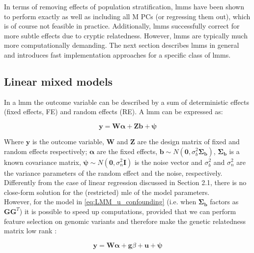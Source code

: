 In terms of removing effects of population stratification, \gls{lmm}s have been shown to perform exactly as well as  including all M PCs (or regressing them out), which is of course not feasible in practice.
Additionally, \gls{lmm}s successfully correct for more subtle effects due to cryptic relatedness.
However, \gls{lmm}s are typically much more computationally demanding.
The next section describes \gls{lmm}s in general and introduces fast implementation approaches for a specific class of \gls{lmm}s.

\subsection{Linear mixed models}

In a \gls{lmm} the outcome variable can be described by a sum of deterministic effects (fixed effects, FE) and random effects (RE).
A \gls{lmm} can be expressed as:

\begin{equation}\label{eq:Linear_mixed_model}
 \mathbf{y} =  \mathbf{W}\boldsymbol{\alpha} + \mathbf{Z}\mathbf{b} + \boldsymbol{\psi} 
\end{equation}

Where $\mathbf{y}$ is the outcome variable, $\mathbf{W}$ and $\mathbf{Z}$ are the design matrix of fixed and random effects respectively; $\boldsymbol{\alpha}$ are the fixed effects, $\mathbf{b} \sim N(\mathbf{0},\sigma_b^2\boldsymbol{\Sigma_b})$, $\boldsymbol{\Sigma_b}$ is a known covariance matrix, $\boldsymbol{\psi} \sim N(\mathbf{0},\sigma_n^2\mathbf{I})$ is the noise vector and $\sigma_b^2$ and $\sigma_n^2$ are the variance parameters of the random effect and the noise, respectively.\\

Differently from the case of linear regression discussed in Section 2.1, there is no close-form solution for the (restricted) \gls{mle} of the model parameters. \\

However, for the model in \eqref{eq:LMM_u_confounding} (i.e. when $\boldsymbol{\Sigma_b}$ factors as $\mathbf{G}\mathbf{G}^T$) it is possible to speed up computations, provided that we can perform feature selection on genomic variants and therefore make the genetic relatedness matrix low rank \cite{lippert2014greater}: 

\begin{equation}\label{eq:Linear_mixed_model}
 \mathbf{y} =  \mathbf{W}\boldsymbol{\alpha} + \mathbf{g}\beta + \mathbf{u} + \boldsymbol{\psi} 
\end{equation}


